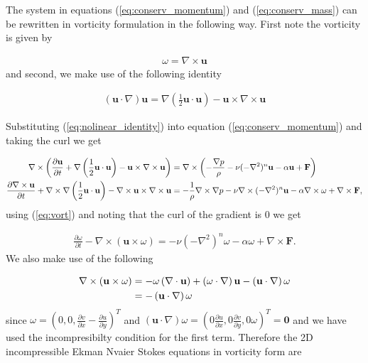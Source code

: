 \documentclass[9pt]{article}
\newcommand{\pder}[2]{\frac{\partial #1}{\partial #2}}               %
\newcommand{\grad}[1]{\nabla{#1}}								%
\newcommand{\curl}[1]{\nabla \times {#1}}								%
\newcommand{\diverg}[1]{\nabla \cdot {#1}}			%
\newcommand{\bfu}{\mathbf{u}}											%
\begin{document}
The system in equations (\ref{eq:conserv_momentum}) and (\ref{eq:conserv_mass}) can be rewritten in vorticity formulation in the following way. First note the vorticity is given by 

\begin{align}
	\omega = \curl{\bfu}
	\label{eq:vort}
\end{align}
and second, we make use of the following identity

\begin{align}
	\left(\bfu \cdot \nabla \right)\bfu = \nabla \left( \frac{1}{2} \bfu \cdot \bfu \right) - \bfu \times \curl{\bfu}
	\label{eq:nolinear_identity}
\end{align}

Substituting (\ref{eq:nolinear_identity}) into equation (\ref{eq:conserv_momentum}) and taking the curl we get

\begin{align}
	\curl{\left(\pder{\bfu}{t} + \nabla \left( \frac{1}{2} \bfu \cdot \bfu \right) - \bfu \times \curl{\bfu}\right)} &= \curl{\left( -\frac{\nabla p}{\rho} - \nu (-\nabla^2)^n  \bfu - \alpha \bfu + \mathbf{F} \right)} \notag \\
	\pder{\curl{\bfu}}{t} + \curl{\nabla \left( \frac{1}{2} \bfu \cdot \bfu \right)} - \curl{\bfu \times \curl{\bfu}} &= -\frac{1}{\rho}\curl{\grad{p}} - \nu \curl{(-\nabla^2)^n \bfu } - \alpha \curl{\omega} + \curl{\mathbf{F}} \notag,
\end{align}
using (\ref{eq:vort}) and noting that the curl of the gradient is 0 we get 

\begin{align}
	\pder{\omega}{t} - \curl{\left( \bfu  \times \omega\right)} = - \nu (-\nabla^2)^n \omega  - \alpha \omega + \curl{\mathbf{F}}.
\end{align}
We also make use of the following

\begin{align}
	\curl{\left( \bfu  \times \omega\right)} &= -\omega \left(\diverg{\bfu} \right) + \left( \omega \cdot \nabla\right)\bfu - \left(\bfu \cdot \nabla\right)\omega \notag \\
	&= - \left(\bfu \cdot \nabla\right)\omega
\end{align}
since $\omega = \left(0, 0, \pder{v}{x} - \pder{u}{y}\right)^{T}$ and $ \left(\bfu \cdot \nabla\right)\omega = \left(0 \pder{u}{x}, 0 \pder{v}{y}, 0 \omega\right)^T = \mathbf{0}$ and we have used the incompresibilty condition for the first term. 
Therefore the 2D incompressible Ekman Nvaier Stokes equations in vorticity form are 
\end{document}
